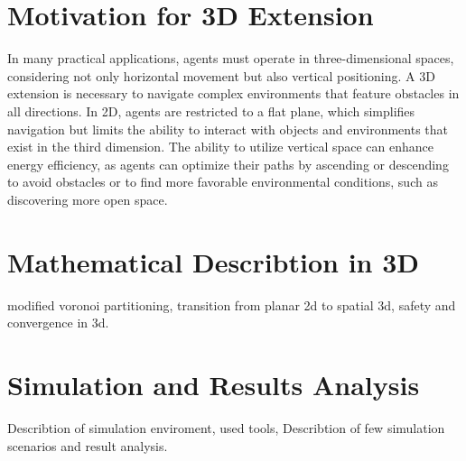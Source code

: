     \section{Motivation for 3D Extension}
        In many practical applications, agents must operate in three-dimensional spaces, considering not only horizontal movement but also vertical positioning.
        A 3D extension is necessary to navigate complex environments that feature obstacles in all directions.
        In 2D, agents are restricted to a flat plane, which simplifies navigation but limits the ability to interact with objects and environments that exist in the third dimension.
        The ability to utilize vertical space can enhance energy efficiency, as agents can optimize their paths by ascending or descending to avoid obstacles or to find more favorable environmental conditions, such as discovering more open space.

    \section{Mathematical Describtion in 3D}

    modified voronoi partitioning, transition from planar 2d to spatial 3d, safety and convergence in 3d.

    \section{Simulation and Results Analysis}

    Describtion of simulation enviroment, used tools, Describtion of few simulation scenarios and result analysis.
